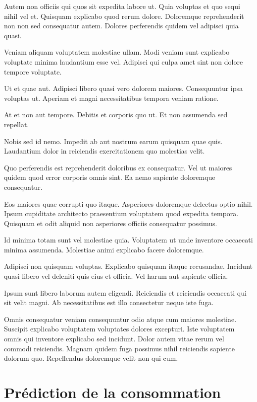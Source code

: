 \documentclass[a4paper]{article}
\begin{document}
\begin{multicols}{2}
Autem non officiis qui quos sit expedita labore ut. Quia voluptas et quo sequi
nihil vel et. Quisquam explicabo quod rerum dolore. Doloremque reprehenderit non
non sed consequatur autem. Dolores perferendis quidem vel adipisci quia quasi.

Veniam aliquam voluptatem molestiae ullam. Modi veniam sunt explicabo voluptate
minima laudantium esse vel. Adipisci qui culpa amet sint non dolore tempore
voluptate.

Ut et quae aut. Adipisci libero quasi vero dolorem maiores. Consequuntur ipsa
voluptas ut. Aperiam et magni necessitatibus tempora veniam ratione.

At et non aut tempore. Debitis et corporis quo ut. Et non assumenda sed
repellat.

Nobis sed id nemo. Impedit ab aut nostrum earum quisquam quae quis. Laudantium
dolor in reiciendis exercitationem quo molestias velit.

Quo perferendis est reprehenderit doloribus ex consequatur. Vel ut maiores
quidem quod error corporis omnis sint. Ea nemo sapiente doloremque consequatur.

Eos maiores quae corrupti quo itaque. Asperiores doloremque delectus optio
nihil. Ipsum cupiditate architecto praesentium voluptatem quod expedita tempora.
Quisquam et odit aliquid non asperiores officiis consequatur possimus.

Id minima totam sunt vel molestiae quia. Voluptatem ut unde inventore occaecati
minima assumenda. Molestiae animi explicabo facere doloremque.

Adipisci non quisquam voluptas. Explicabo quisquam itaque recusandae. Incidunt
quasi libero vel deleniti quis eius et officia. Vel harum aut sapiente officia.

Ipsum sunt libero laborum autem eligendi. Reiciendis et reiciendis occaecati qui
sit velit magni. Ab necessitatibus est illo consectetur neque iste fuga.

Omnis consequatur veniam consequuntur odio atque cum maiores molestiae. Suscipit
explicabo voluptatem voluptates dolores excepturi. Iste voluptatem omnis qui
inventore explicabo sed incidunt. Dolor autem vitae rerum vel commodi
reiciendis. Magnam quidem fuga possimus nihil reiciendis sapiente dolorum quo.
Repellendus doloremque velit non qui cum.

\end{multicols}

\clearpage
\section{Prédiction de la consommation}
\end{document}
